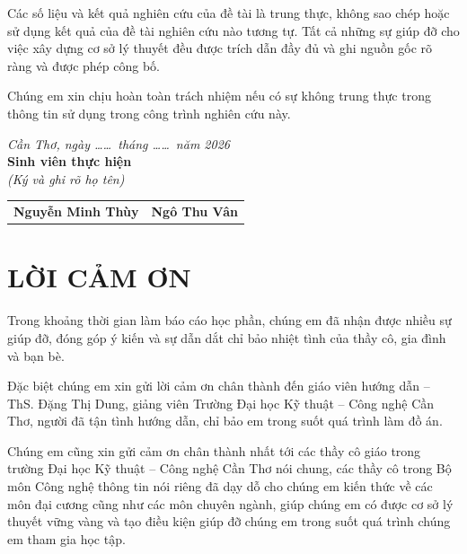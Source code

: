 \documentclass[12pt,a4paper,oneside]{report}
\begin{document}
Các số liệu và kết quả nghiên cứu của đề tài là trung thực, không sao chép hoặc sử dụng kết quả của đề tài nghiên cứu nào tương tự. Tất cả những sự giúp đỡ cho việc xây dựng cơ sở lý thuyết đều được trích dẫn đầy đủ và ghi nguồn gốc rõ ràng và được phép công bố.

Chúng em xin chịu hoàn toàn trách nhiệm nếu có sự không trung thực trong thông tin sử dụng trong công trình nghiên cứu này.

\vspace{1.5cm}

\begin{flushright}
  \textit{Cần Thơ, ngày \dots\dots\ tháng \dots\dots\ năm 2026}\\[4pt]
  \textbf{Sinh viên thực hiện}\\[4pt]
  \textit{(Ký và ghi rõ họ tên)}\\[2.5cm]
\end{flushright}

\begin{center}
\begin{tabular}{p{}p{}}
  \centering \textbf{Nguyễn Minh Thùy} & \centering \textbf{Ngô Thu Vân}
\end{tabular}
\end{center}

\newpage

\chapter*{LỜI CẢM ƠN}

Trong khoảng thời gian làm báo cáo học phần, chúng em đã nhận được nhiều sự giúp đỡ, đóng góp ý kiến và sự dẫn dắt chỉ bảo nhiệt tình của thầy cô, gia đình và bạn bè.

Đặc biệt chúng em xin gửi lời cảm ơn chân thành đến giáo viên hướng dẫn -- ThS. Đặng Thị Dung, giảng viên Trường Đại học Kỹ thuật -- Công nghệ Cần Thơ, người đã tận tình hướng dẫn, chỉ bảo em trong suốt quá trình làm đồ án.

Chúng em cũng xin gửi cảm ơn chân thành nhất tới các thầy cô giáo trong trường Đại học Kỹ thuật -- Công nghệ Cần Thơ nói chung, các thầy cô trong Bộ môn Công nghệ thông tin nói riêng đã dạy dỗ cho chúng em kiến thức về các môn đại cương cũng như các môn chuyên ngành, giúp chúng em có được cơ sở lý thuyết vững vàng và tạo điều kiện giúp đỡ chúng em trong suốt quá trình chúng em tham gia học tập.
\end{document}
